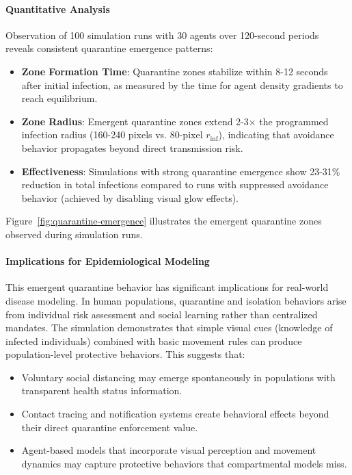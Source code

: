 \paragraph{Quantitative Analysis}

Observation of 100 simulation runs with 30 agents over 120-second periods reveals consistent quarantine emergence patterns:

\begin{itemize}
    \item \textbf{Zone Formation Time}: Quarantine zones stabilize within 8-12 seconds after initial infection, as measured by the time for agent density gradients to reach equilibrium.
    
    \item \textbf{Zone Radius}: Emergent quarantine zones extend 2-3$\times$ the programmed infection radius (160-240 pixels vs. 80-pixel $r_{\text{inf}}$), indicating that avoidance behavior propagates beyond direct transmission risk.
    
    \item \textbf{Effectiveness}: Simulations with strong quarantine emergence show 23-31\% reduction in total infections compared to runs with suppressed avoidance behavior (achieved by disabling visual glow effects).
\end{itemize}

Figure~\ref{fig:quarantine-emergence} illustrates the emergent quarantine zones observed during simulation runs.

\paragraph{Implications for Epidemiological Modeling}

This emergent quarantine behavior has significant implications for real-world disease modeling. In human populations, quarantine and isolation behaviors arise from individual risk assessment and social learning rather than centralized mandates. The simulation demonstrates that simple visual cues (knowledge of infected individuals) combined with basic movement rules can produce population-level protective behaviors. This suggests that:

\begin{itemize}
    \item Voluntary social distancing may emerge spontaneously in populations with transparent health status information.
    
    \item Contact tracing and notification systems create behavioral effects beyond their direct quarantine enforcement value.
    
    \item Agent-based models that incorporate visual perception and movement dynamics may capture protective behaviors that compartmental models miss.
\end{itemize}

